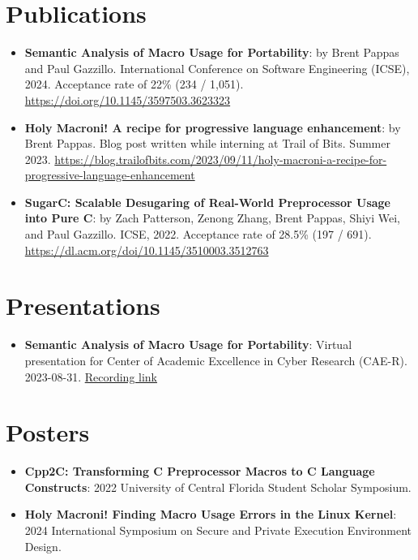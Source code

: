 \documentclass{article}
\newcommand{\resumeItem}[2]{
  \item\small{
    \textbf{#1}{: #2 \vspace{-2pt}}
  }
}
\newcommand{\resumeSubItem}[2]{\resumeItem{#1}{#2}\vspace{-3pt}}
\newcommand{\resumeSubHeadingListStart}{\begin{itemize}[leftmargin=*, label={}]}
\newcommand{\resumeSubHeadingListEnd}{\end{itemize}}
\begin{document}
\vspace{-5pt}
\section{Publications}
\resumeSubHeadingListStart{}

\resumeSubItem{Semantic Analysis of Macro Usage for Portability}
{by Brent Pappas and Paul Gazzillo. International Conference on Software Engineering (ICSE), 2024. Acceptance rate of 22\% (234 / 1,051).
	\url{https://doi.org/10.1145/3597503.3623323}}

\resumeSubItem{Holy Macroni! A recipe for progressive language enhancement}
{by Brent Pappas. Blog post written while interning at Trail of Bits. Summer
	2023.
	\url{https://blog.trailofbits.com/2023/09/11/holy-macroni-a-recipe-for-progressive-language-enhancement}}

\resumeSubItem{SugarC\@: Scalable Desugaring of Real-World Preprocessor Usage into Pure C}
{by Zach Patterson, Zenong Zhang, Brent Pappas, Shiyi Wei, and Paul Gazzillo. ICSE, 2022. Acceptance rate of 28.5\% (197 / 691).
	\url{https://dl.acm.org/doi/10.1145/3510003.3512763}}
\resumeSubHeadingListEnd{}

\vspace{-5pt}
\section{Presentations}
\resumeSubHeadingListStart{}
\resumeSubItem{Semantic Analysis of Macro Usage for Portability}
{Virtual presentation for Center of Academic Excellence in Cyber Research (CAE-R). 2023{-}08{-}31. \href{https://drive.google.com/file/d/1xCd34w54hs1iyaoXHz0MUkwlH-fP3HLo/view} {Recording link}}
\resumeSubHeadingListEnd{}

\vspace{-5pt}
\section{Posters}
\resumeSubHeadingListStart{}
\resumeSubItem{Cpp2C\@: Transforming C Preprocessor Macros to C Language Constructs}
{2022 University of Central Florida Student Scholar Symposium.}
\resumeSubItem{Holy Macroni! Finding Macro Usage Errors in the Linux Kernel}
{2024 International Symposium on Secure and Private Execution Environment Design.}
\resumeSubHeadingListEnd{}
\end{document}

